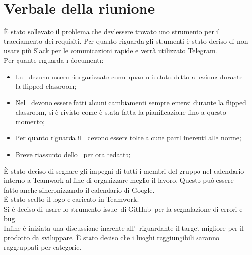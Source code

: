 \documentclass[../Riunione16-01-07.tex]{subfiles}
\begin{document}
\section{Verbale della riunione}
È stato sollevato il problema che dev'essere trovato uno strumento per il tracciamento dei requisiti. Per quanto riguarda gli strumenti è stato deciso di non usare più Slack per le comunicazioni rapide e verrà utilizzato Telegram. \\
Per quanto riguarda i documenti:
\begin{itemize}
	\item Le \normediprogetto\ devono essere riorganizzate come quanto è stato detto a lezione durante la flipped classroom;
	\item Nel \pianodiprogetto\ devono essere fatti alcuni cambiamenti sempre emersi durante la flipped classroom, si è rivisto come è stata fatta la pianificazione fino a questo momento;
	\item Per quanto riguarda il \pianodiqualifica\ devono essere tolte alcune parti inerenti alle norme;
	\item Breve riassunto dello \studiodifattibilita\ per ora redatto;
\end{itemize}
È stato deciso di segnare gli impegni di tutti i membri del gruppo nel calendario interno a Teamwork al fine di organizzare meglio il lavoro. Questo può essere fatto anche sincronizzando il calendario di Google.\\
È stato scelto il logo e caricato in Teamwork.\\
Si è deciso di usare lo strumento issue\g\ di GitHub\g\ per la segnalazione di errori e bug.\\
Infine è iniziata una discussione inerente all'\analisideirequisiti\ riguardante il target migliore per il prodotto da sviluppare. È stato deciso che i luoghi raggiungibili saranno raggruppati per categorie.
\end{document}
